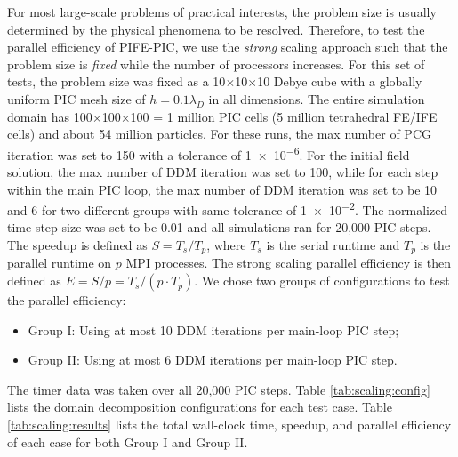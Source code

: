 \documentclass{siamart171218}
\begin{document}
For most large-scale problems of practical interests,
the problem size is usually determined by the physical phenomena to be resolved.
Therefore, to test the parallel efficiency of PIFE-PIC,
we use the \emph{strong} scaling approach such that
the problem size is \emph{fixed} while the number of processors increases.
For this set of tests, the problem size was fixed
as a 10$\times$10$\times$10 Debye cube
with a globally uniform PIC mesh size of $h = 0.1 \lambda_D$ in all dimensions.
The entire simulation domain has 100$\times$100$\times$100 = 1 million PIC cells
(5 million tetrahedral FE/IFE cells)
{and about 54 million particles}.
For these runs,
the max number of PCG iteration was set to 150 with a tolerance of \num{1e-6}.
For the initial field solution,
the max number of DDM iteration was set to 100,
while for each step within the main PIC loop,
the max number of DDM iteration
was set to be 10 and 6 for two different groups
with same tolerance of \num{1e-2}.
The normalized time step size was set to be 0.01 and
all simulations ran for 20,000 PIC steps.
The speedup is defined as $S = {T_s}/{T_p}$,
where $T_s$ is the serial runtime and $T_p$ is the
parallel runtime on $p$ MPI processes.
The strong scaling parallel efficiency is then
defined as $E = S/p = {T_s}/{(p \cdot T_p)}$.
We chose two groups of configurations to test the parallel efficiency:

\begin{itemize}
\item Group I: Using at most 10 DDM iterations per main-loop PIC step;

\item Group II: Using at most 6 DDM iterations per main-loop PIC step.

\end{itemize}
The timer data was taken over all 20,000 PIC steps.
Table \ref{tab:scaling:config} lists the domain decomposition configurations
for each test case.
Table \ref{tab:scaling:results} lists the total wall-clock time,
speedup, and parallel efficiency of each case for both Group I and Group II.
\end{document}
